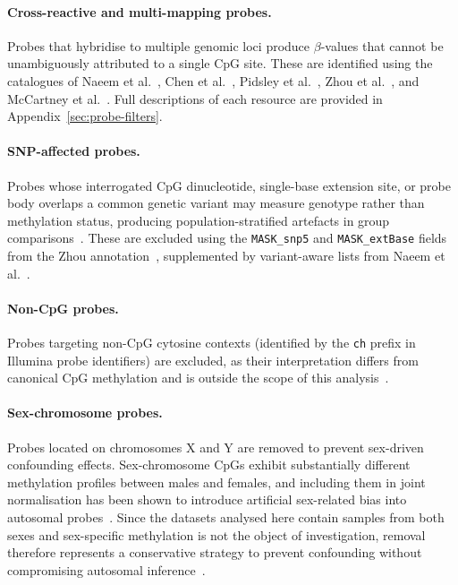 \paragraph{Cross-reactive and multi-mapping probes.} Probes that 
hybridise to multiple genomic loci produce $\beta$-values that cannot 
be unambiguously attributed to a single CpG site. These are identified 
using the catalogues of Naeem et al.~\cite{naeem2014}, Chen et 
al.~\cite{chen2013}, Pidsley et al.~\cite{pidsley2016}, Zhou et 
al.~\cite{zhou2017}, and McCartney et al.~\cite{mccartney2016}. Full 
descriptions of each resource are provided in Appendix~\ref{sec:probe-filters}.

\paragraph{SNP-affected probes.} Probes whose interrogated CpG 
dinucleotide, single-base extension site, or probe body overlaps a 
common genetic variant may measure genotype rather than methylation 
status, producing population-stratified artefacts in group 
comparisons~\cite{zhou2017, pidsley2016}. These are excluded using the 
\texttt{MASK\_snp5} and \texttt{MASK\_extBase} fields from the Zhou 
annotation~\cite{zhou2017}, supplemented by variant-aware lists from 
Naeem et al.~\cite{naeem2014}.

\paragraph{Non-CpG probes.} Probes targeting non-CpG cytosine contexts 
(identified by the \texttt{ch} prefix in Illumina probe identifiers) are 
excluded, as their interpretation differs from canonical CpG methylation 
and is outside the scope of this analysis~\cite{zhou2017, pidsley2016}.

\paragraph{Sex-chromosome probes.} Probes located on chromosomes X and Y 
are removed to prevent sex-driven confounding effects. Sex-chromosome 
CpGs exhibit substantially different methylation profiles between males 
and females, and including them in joint normalisation has been shown to 
introduce artificial sex-related bias into autosomal 
probes~\cite{Wang2022InterpolatedXY}. Since the datasets analysed here contain samples 
from both sexes and sex-specific methylation is not the object of 
investigation, removal therefore represents a conservative strategy to prevent confounding without compromising autosomal inference~\cite{maksimovic2012}.

